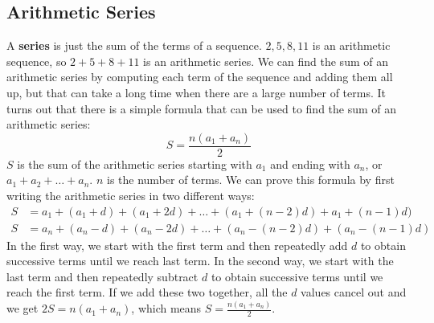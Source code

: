 \documentclass{article}
\begin{document}
    \subsection*{Arithmetic Series}
    A \textbf{series} is just the sum of the terms of a sequence. $2, 5, 8, 11$ is an arithmetic sequence, so $2 + 5 + 8 + 11$ is an arithmetic series. We can find the sum of an arithmetic series by computing each term of the sequence and adding them all up, but that can take a long time when there are a large number of terms. It turns out that there is a simple formula that can be used to find the sum of an arithmetic series:
    \[S = \frac{n(a_1 + a_n)}{2}\]
    $S$ is the sum of the arithmetic series starting with $a_1$ and ending with $a_n$, or $a_1 + a_2 + \dots + a_n$. $n$ is the number of terms. We can prove this formula by first writing the arithmetic series in two different ways:
    \begin{align*}
        S &= a_1 + (a_1 + d) + (a_1 + 2d) + \dots + (a_1 + (n - 2)d) + a_1 + (n - 1)d) \\
        S &= a_n + (a_n - d) + (a_n - 2d) + \dots + (a_n - (n - 2)d) + (a_n - (n - 1)d)
    \end{align*}
    In the first way, we start with the first term and then repeatedly add $d$ to obtain successive terms until we reach last term. In the second way, we start with the last term and then repeatedly subtract $d$ to obtain successive terms until we reach the first term. If we add these two together, all the $d$ values cancel out and we get $2S = n(a_1 + a_n)$, which means $S = \frac{n(a_1 + a_n)}{2}$.
\end{document}
